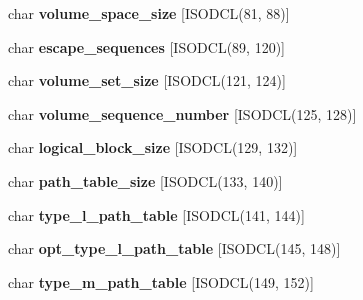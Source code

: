 \begin{DoxyCompactItemize}
char {\bfseries volume\+\_\+space\+\_\+size} \mbox{[}I\+S\+O\+D\+CL(81, 88)\mbox{]}
\item 
\mbox{\label{structiso__enhanced__descriptor_a5b5c6b8fa7ae744040d825240f7b834d}} 
char {\bfseries escape\+\_\+sequences} \mbox{[}I\+S\+O\+D\+CL(89, 120)\mbox{]}
\item 
\mbox{\label{structiso__enhanced__descriptor_a4f6850731ab6cf7ecd2eb2ad8368e8a3}} 
char {\bfseries volume\+\_\+set\+\_\+size} \mbox{[}I\+S\+O\+D\+CL(121, 124)\mbox{]}
\item 
\mbox{\label{structiso__enhanced__descriptor_a27cf835a64a02756c014e1260a5dc160}} 
char {\bfseries volume\+\_\+sequence\+\_\+number} \mbox{[}I\+S\+O\+D\+CL(125, 128)\mbox{]}
\item 
\mbox{\label{structiso__enhanced__descriptor_a5ec4f2d1c78fcee94b2500704048a461}} 
char {\bfseries logical\+\_\+block\+\_\+size} \mbox{[}I\+S\+O\+D\+CL(129, 132)\mbox{]}
\item 
\mbox{\label{structiso__enhanced__descriptor_a70c848dbcf84c9e67c41e68ca4b5cf26}} 
char {\bfseries path\+\_\+table\+\_\+size} \mbox{[}I\+S\+O\+D\+CL(133, 140)\mbox{]}
\item 
\mbox{\label{structiso__enhanced__descriptor_abb687ba5098796c143d44cb0deb6c00e}} 
char {\bfseries type\+\_\+l\+\_\+path\+\_\+table} \mbox{[}I\+S\+O\+D\+CL(141, 144)\mbox{]}
\item 
\mbox{\label{structiso__enhanced__descriptor_a85911ab91552917ff0642a684bf4cb20}} 
char {\bfseries opt\+\_\+type\+\_\+l\+\_\+path\+\_\+table} \mbox{[}I\+S\+O\+D\+CL(145, 148)\mbox{]}
\item 
\mbox{\label{structiso__enhanced__descriptor_a6ec1b9979de9972110db2d10828aba96}} 
char {\bfseries type\+\_\+m\+\_\+path\+\_\+table} \mbox{[}I\+S\+O\+D\+CL(149, 152)\mbox{]}
\item 
\mbox{\label{structiso__enhanced__descriptor_a732e03cd848878d570cb3ae79d8f384f}} 

\end{DoxyCompactItemize}
